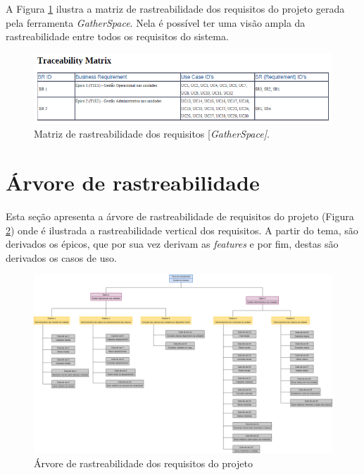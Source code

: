     A Figura \ref{fig:matriz_rastreabilidade} ilustra a matriz de rastreabilidade dos requisitos do projeto gerada pela ferramenta
   \textit{GatherSpace}. Nela é possível ter uma visão ampla da rastreabilidade entre todos os requisitos do sistema.  
  
      \begin{figure}[!htbp]
	\centering
	\includegraphics[scale= 0.9, angle = 0]{figuras/matriz_rastreabilidade}
	\caption[Matriz de rastreabilidade dos requisitos [\textit{GatherSpace]}]
	    {Matriz de rastreabilidade dos requisitos [\textit{GatherSpace]}.}
	\label{fig:matriz_rastreabilidade}
      \end{figure}
  
  \section{Árvore de rastreabilidade}
  
  Esta seção apresenta a árvore de rastreabilidade de requisitos do projeto (Figura \ref{fig:arvore_rastreabilidade}) onde é ilustrada
  a rastreabilidade vertical dos requisitos. A partir do tema, são derivados os épicos, que por sua vez derivam as \textit{features}
  e por fim, destas são derivados os casos de uso.
  
    \begin{figure}[!htbp]
	\centering
	\includegraphics[scale=0.35, angle = 90]{figuras/arvore_rastreabilidade}
	\caption[Árvore de rastreabilidade dos requisitos do projeto]
	    {Árvore de rastreabilidade dos requisitos do projeto}
	\label{fig:arvore_rastreabilidade}
      \end{figure}